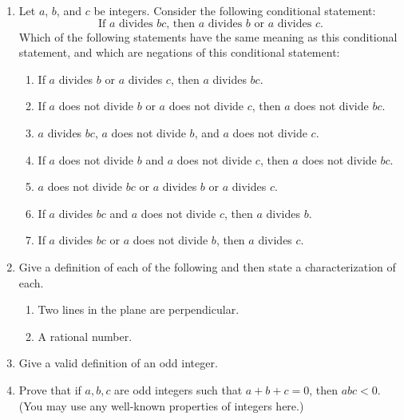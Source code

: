 \documentclass[12pt]{article}
\begin{document}
\begin{enumerate}
\newpage %
\item  Let $a$, $b$, and $c$ be integers.
  Consider the following conditional statement:
  \[\mbox{If $a$ divides $bc$, then $a$ divides $b$ or $a$ divides $c$.}\]
  Which of the following statements have the same meaning as this conditional statement, and which are negations of this
  conditional statement:
  \begin{enumerate}
   \item If $a$ divides $b$ or $a$ divides $c$, then $a$ divides $bc$.
   \item If $a$ does not divide $b$ or $a$ does not divide $c$, then $a$ does not divide $bc$.
   \item $a$ divides $bc$, $a$ does not divide $b$, and $a$ does not divide $c$.
   \item If $a$ does not divide $b$ and $a$ does not divide $c$, then $a$ does not divide $bc$.
   \item $a$ does not divide $bc$ or $a$  divides $b$ or $a$  divides $c$.
   \item If $a$ divides $bc$ and $a$ does not divide $c$, then $a$ divides $b$.
   \item If $a$ divides $bc$ or $a$ does not divide $b$, then $a$ divides $c$.
  \end{enumerate}

\item   Give a definition of each of the following and then state a characterization of each.
 \begin{enumerate}
   \item  Two lines in the plane are perpendicular.
   \item  A rational number.
\end{enumerate}

\item Give a valid definition of an odd integer.
 
 \item Prove that if $a,b,c$ are odd integers such that $a+b+c=0$, then $abc<0$.
   (You may use any well-known properties of integers here.)\bigskip
   



\end{enumerate}
\end{document}
